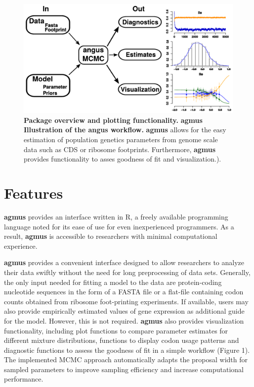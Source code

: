 \documentclass{bioinfo}
\newcommand{\package}{\textbf{agmus }} %
\begin{document}
\begin{figure}[!tpb]
\centering
 \includegraphics[width=5in]{workflow_croped.pdf}
\vspace{-0.2cm}
\caption{\textbf{Package overview and plotting functionality.} \package \textbf{Illustration of the angus workflow.} 
\package allows for the easy estimation of population genetics parameters from genome scale data such as CDS or ribosome footprints. 
Furthermore, \package provides functionality to asses goodness of fit and visualization.). 
}
\label{fig:plotbin}
\end{figure}

\section*{Features}
\package provides an interface written in R, a freely available programming language noted for its ease of use for even inexperienced programmers. 
As a result, \package is accessible to researchers with minimal computational experience. 

\package provides a convenient interface designed to allow researchers to analyze their data swiftly without the need for long preprocessing of data sets. 
Generally, the only input needed for fitting a model to the data are protein-coding nucleotide sequences in the form of a FASTA file or a flat-file containing codon counts obtained from ribosome foot-printing experiments. 
If available, users may also provide empirically estimated values of gene expression as additional guide for the model. However, this is not required.
\package also provides visualization functionality, including plot functions to compare parameter estimates for different mixture distributions, functions to display codon usage patterns and diagnostic functions to assess the goodness of fit in a simple workflow (Figure 1).
The implemented MCMC approach automatically adapts the proposal width for sampled parameters to improve sampling efficiency and increase computational performance. 
\end{document}
